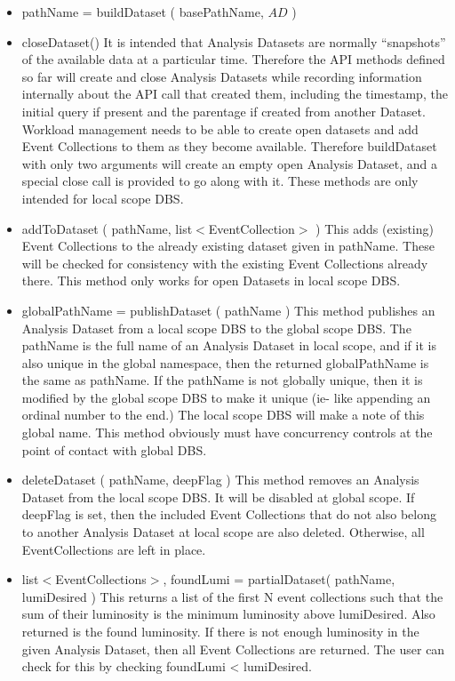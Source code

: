 \documentclass[pdftex]{cmspaper}
\begin{document}
\begin{itemize}
\item  pathName = buildDataset ( basePathName, $AD$ )
\item  closeDataset() 
       It is intended that Analysis Datasets are normally ``snapshots''
       of the available data at a particular time.  Therefore the API
       methods defined so far will create and close Analysis Datasets
       while recording information internally about the API call that
       created them, including the timestamp, the initial query if
       present and the parentage if created from another Dataset.
       Workload management needs to be able to create open datasets
       and add Event Collections to them as they become available.
       Therefore buildDataset with only two arguments will create an
       empty open Analysis Dataset, and a special close call is provided
       to go along with it.  These methods are only intended for local
       scope DBS.

\item  addToDataset ( pathName, list$<$EventCollection$>$ )
       This adds (existing) Event Collections to the already existing dataset 
       given in pathName.  These will be checked for consistency with the 
       existing Event Collections already there.  This method only works for 
       open Datasets in local scope DBS.
   
\item  globalPathName = publishDataset ( pathName )
      This method publishes an Analysis Dataset from a local scope DBS
      to the global scope DBS.  The pathName is the full name of an
      Analysis Dataset in local scope, and if it is also unique in the
      global namespace, then the returned globalPathName is the same
      as pathName.  If the pathName is not globally unique, then it
      is modified by the global scope DBS to make it unique (ie- like
      appending an ordinal number to the end.) The local scope DBS will
      make a note of this global name.  This method obviously must have
      concurrency controls at the point of contact with global DBS.

\item  deleteDataset ( pathName, deepFlag ) 
      This method removes an Analysis Dataset from the local scope DBS.
      It will be disabled at global scope.  If deepFlag is set, then
      the included Event Collections that do not also belong to another
      Analysis Dataset at local scope are also deleted.  Otherwise,
      all EventCollections are left in place.

\item  list$<$EventCollections$>$, foundLumi = partialDataset( pathName, lumiDesired )
       This returns a list of the first N event collections such that the sum 
       of their luminosity is the minimum luminosity above lumiDesired.  Also 
       returned is the found luminosity.  If there is not enough luminosity in 
       the given Analysis Dataset, then all Event Collections are returned.  
       The user can check for this by checking foundLumi < lumiDesired.

\end{itemize}
\end{document}
